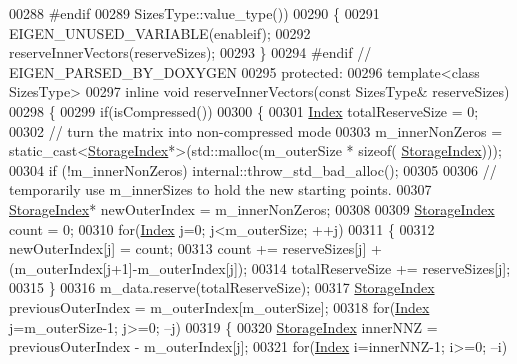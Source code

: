 \begin{DoxyCode}
00288     #endif
00289         SizesType::value\_type())
00290     \{
00291       EIGEN\_UNUSED\_VARIABLE(enableif);
00292       reserveInnerVectors(reserveSizes);
00293     \}
00294 \textcolor{preprocessor}{    #endif // EIGEN\_PARSED\_BY\_DOXYGEN}
00295   \textcolor{keyword}{protected}:
00296     \textcolor{keyword}{template}<\textcolor{keyword}{class} SizesType>
00297     \textcolor{keyword}{inline} \textcolor{keywordtype}{void} reserveInnerVectors(\textcolor{keyword}{const} SizesType& reserveSizes)
00298     \{
00299       \textcolor{keywordflow}{if}(isCompressed())
00300       \{
00301         \hyperlink{group___core___module_a554f30542cc2316add4b1ea0a492ff02}{Index} totalReserveSize = 0;
00302         \textcolor{comment}{// turn the matrix into non-compressed mode}
00303         m\_innerNonZeros = \textcolor{keyword}{static\_cast<}\hyperlink{group___sparse_core___module_a0b540ba724726ebe953f8c0df06081ed}{StorageIndex}*\textcolor{keyword}{>}(std::malloc(m\_outerSize * \textcolor{keyword}{sizeof}(
      \hyperlink{group___sparse_core___module_a0b540ba724726ebe953f8c0df06081ed}{StorageIndex})));
00304         \textcolor{keywordflow}{if} (!m\_innerNonZeros) internal::throw\_std\_bad\_alloc();
00305         
00306         \textcolor{comment}{// temporarily use m\_innerSizes to hold the new starting points.}
00307         \hyperlink{group___sparse_core___module_a0b540ba724726ebe953f8c0df06081ed}{StorageIndex}* newOuterIndex = m\_innerNonZeros;
00308         
00309         \hyperlink{group___sparse_core___module_a0b540ba724726ebe953f8c0df06081ed}{StorageIndex} count = 0;
00310         \textcolor{keywordflow}{for}(\hyperlink{group___core___module_a554f30542cc2316add4b1ea0a492ff02}{Index} j=0; j<m\_outerSize; ++j)
00311         \{
00312           newOuterIndex[j] = count;
00313           count += reserveSizes[j] + (m\_outerIndex[j+1]-m\_outerIndex[j]);
00314           totalReserveSize += reserveSizes[j];
00315         \}
00316         m\_data.reserve(totalReserveSize);
00317         \hyperlink{group___sparse_core___module_a0b540ba724726ebe953f8c0df06081ed}{StorageIndex} previousOuterIndex = m\_outerIndex[m\_outerSize];
00318         \textcolor{keywordflow}{for}(\hyperlink{group___core___module_a554f30542cc2316add4b1ea0a492ff02}{Index} j=m\_outerSize-1; j>=0; --j)
00319         \{
00320           \hyperlink{group___sparse_core___module_a0b540ba724726ebe953f8c0df06081ed}{StorageIndex} innerNNZ = previousOuterIndex - m\_outerIndex[j];
00321           \textcolor{keywordflow}{for}(\hyperlink{group___core___module_a554f30542cc2316add4b1ea0a492ff02}{Index} i=innerNNZ-1; i>=0; --i)

\end{DoxyCode}
